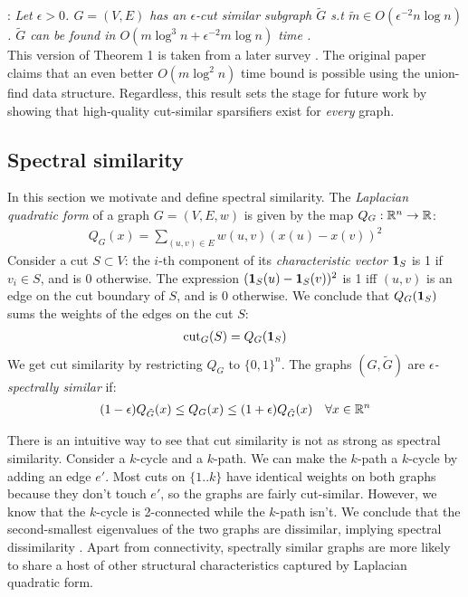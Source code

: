 \documentclass{article}
\begin{document}
\noindent
{}: \textit{Let $\epsilon > 0$. $G =
(V, E)$ has an $\epsilon$-cut similar subgraph $\tilde{G}$ s.t $\tilde{m}
\in O(\epsilon^{-2}n\log n)$. $\tilde{G}$ can be found in $O(m\log^3n +
\epsilon^{-2}m\log n)$ time \cite{BenczurKarger}.} \\

This version of Theorem 1 is taken from a later survey \cite{TheSurvey}. The
original paper claims that an even better $O(m\log^2 n)$ time bound is
possible using the union-find data structure. Regardless, this result sets
the stage for future work by showing that high-quality cut-similar
sparsifiers exist for \textit{every} graph. 

\subsection{Spectral similarity}

In this section we motivate and define spectral similarity. The
\textit{Laplacian quadratic form} of a graph $G = (V, E, w)$ is given by the
map $Q_G : \mathbb{R}^n \rightarrow \mathbb{R}$:
\begin{align*}
    Q_G(x) = \sum_{(u, v) \in E} w(u, v)(x(u) - x(v))^2
\end{align*}
Consider a cut $S \subset V$: the $i$-th component of its
\textit{characteristic vector} $\mathbf{1}_S$ is 1 if $v_i \in S$, and is 0
otherwise. The expression $(\mathbf{1}_S(u) - \mathbf{1}_S(v))^2$ is 1 iff
$(u, v)$ is an edge on the cut boundary of $S$, and is 0 otherwise. We
conclude that $Q_G(\mathbf{1}_S)$ sums the weights of the edges on the cut
$S$:
\begin{align*}
    \text{cut}_{G}(S) = Q_G(\mathbf{1}_S)
\end{align*}
We get cut similarity by restricting $Q_G$ to $\{0, 1\}^n$. The graphs $(G,
\tilde{G})$ are \textit{$\epsilon$-spectrally similar} if:
\begin{align*}
    (1 - \epsilon)Q_{\tilde{G}}(x) \leq Q_G(x) \leq (1 +
    \epsilon)Q_{\tilde{G}}(x) \quad \forall{x \in \mathbb{R}^n}
\end{align*}

There is an intuitive way to see that cut similarity is not as strong as
spectral similarity. Consider a $k$-cycle and a $k$-path. We can make the
$k$-path a $k$-cycle by adding an edge $e'$. Most cuts on $\{1..k\}$ have
identical weights on both graphs because they don't touch $e'$, so the
graphs are fairly cut-similar. However, we know that the $k$-cycle is
2-connected while the $k$-path isn't. We conclude that the second-smallest
eigenvalues of the two graphs are dissimilar, implying spectral
dissimilarity \cite{Fiedler}. Apart from connectivity, spectrally similar
graphs are more likely to share a host of other structural characteristics
captured by Laplacian quadratic form.
\end{document}
